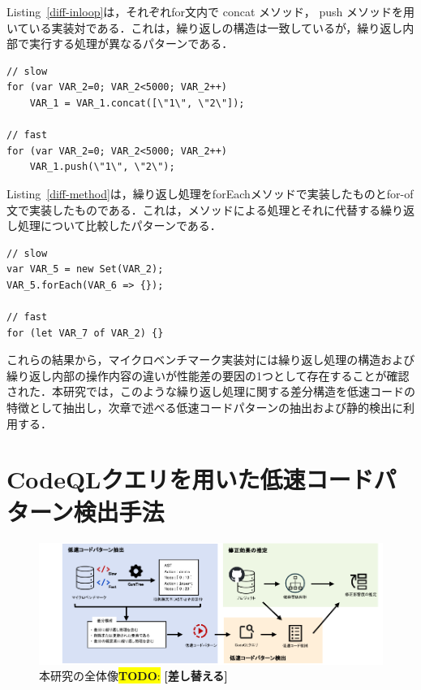 \documentclass[submit,techrep,noauthor]{ipsj}
\newcommand{\todo}[1]{\colorbox{yellow}{{\bf TODO}:}{\color{red} {\textbf{[#1]}}}}
\begin{document}
Listing~\ref{diff-inloop}は，それぞれfor文内で concat メソッド， push メソッドを用いている実装対である．これは，繰り返しの構造は一致しているが，繰り返し内部で実行する処理が異なるパターンである．
\begin{lstlisting}[caption=Pairs with differences within the loop, label=diff-inloop, captionpos=t, columns=flexible]
// slow
for (var VAR_2=0; VAR_2<5000; VAR_2++)
    VAR_1 = VAR_1.concat([\"1\", \"2\"]);

// fast
for (var VAR_2=0; VAR_2<5000; VAR_2++)
    VAR_1.push(\"1\", \"2\");
\end{lstlisting}

Listing~\ref{diff-method}は，繰り返し処理をforEachメソッドで実装したものとfor-of文で実装したものである．これは，メソッドによる処理とそれに代替する繰り返し処理について比較したパターンである．
\begin{lstlisting}[caption=Pairs of Method and alternative loop, label=diff-method, captionpos=t, columns=flexible]
// slow
var VAR_5 = new Set(VAR_2);
VAR_5.forEach(VAR_6 => {});

// fast
for (let VAR_7 of VAR_2) {}
\end{lstlisting}

これらの結果から，マイクロベンチマーク実装対には繰り返し処理の構造および繰り返し内部の操作内容の違いが性能差の要因の1つとして存在することが確認された．本研究では，このような繰り返し処理に関する差分構造を低速コードの特徴として抽出し，次章で述べる低速コードパターンの抽出および静的検出に利用する．


\section{CodeQLクエリを用いた低速コードパターン検出手法}
\label{sec:approach}

\begin{figure}[t]
    \centering
    \includegraphics[width=1.0\linewidth]{./Noguchi_fig/approach_abst.pdf}
    \caption{本研究の全体像\todo{差し替える}}
    \label{fig:Approach}
\end{figure}
\end{document}
